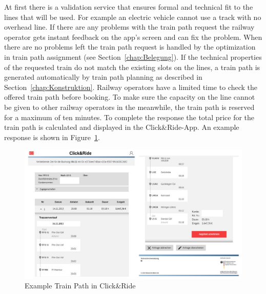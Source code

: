 At first there is a validation service that ensures formal and technical fit to the lines that will be used. For example an electric vehicle cannot use a track with no overhead line. If there are any problems with the train path request the railway operator gets instant feedback on the app's screen and can fix the problem. When there are no problems left the train path request is handled by the optimization in train path assignment (see Section~\ref{chap:Belegung}). If the technical properties of the requested train do not match the existing slots on the lines, a train path is generated automatically by train path planning as described in Section~\ref{chap:Konstruktion}. Railway operators have a limited time to check the offered train path before booking. To make sure the capacity on the line cannot be given to other railway operators in the meanwhile, the train path is reserved for a maximum of ten minutes. To complete the response the total price for the train path is calculated and displayed in the Click\&Ride-App. An example response is shown in Figure~\ref{fig:CnR_response}.
\begin{figure}[htb]
	\centering
	\includegraphics[width=\textwidth]{Bilder/response.jpg}
	\caption{Example Train Path in Click\&Ride}
	\label{fig:CnR_response}
\end{figure}

